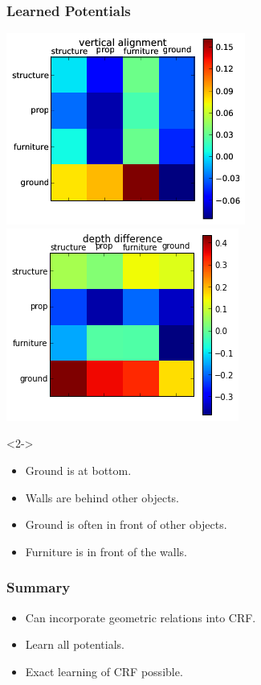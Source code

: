 \documentclass[final,ignorenonframetext,compress]{beamer}
\begin{document}
\begin{frame}
    \frametitle{Learned Potentials}
    \begin{center}
    \includegraphics[width=.45\linewidth]{images/vertical_alignment_png}
    \includegraphics[width=.45\linewidth]{images/depth_difference_png}
    \begin{visibleenv}<2->
    \begin{itemize}
        \item Ground is at bottom.
        \item Walls are behind other objects.
        \item Ground is often in front of other objects.
        \item Furniture is in front of the walls.
    \end{itemize}
    \end{visibleenv}
    \end{center}
\end{frame}

\begin{frame}
    \frametitle{Summary}
    \begin{itemize}
        \item Can incorporate geometric relations into CRF.
        \item Learn all potentials.
        \item Exact learning of CRF possible.
    \end{itemize}
\end{frame}
\end{document}

